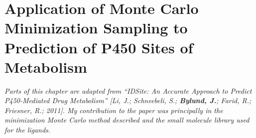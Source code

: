 \chapter[Monte Carlo Minimization in SOM Prediction]{Application of Monte Carlo Minimization Sampling to Prediction of P450 Sites of Metabolism}
\label{chapter:p450}
\textit{ Parts of this chapter are adapted from ``IDSite: An Accurate Approach to Predict P450-Mediated Drug Metabolism''  [Li, J.; Schneebeli, S.; \textbf{Bylund, J.}; Farid, R.; Friesner, R.; 2011].
My contribution to the paper was principally in the minimization Monte Carlo method described and the small molecule library used for the ligands.}




